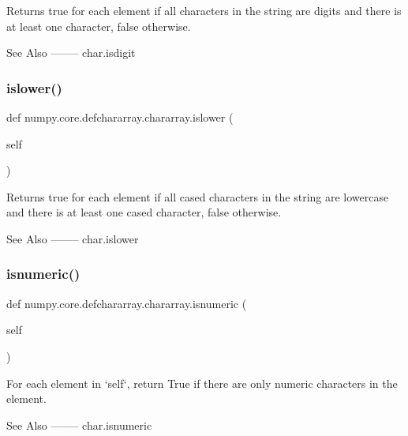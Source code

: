 \begin{DoxyVerb}Returns true for each element if all characters in the string are
digits and there is at least one character, false otherwise.

See Also
--------
char.isdigit\end{DoxyVerb}
 \mbox{\label{classnumpy_1_1core_1_1defchararray_1_1chararray_a3b792f2fd5d25aa1db29a0bf484e2c18}} 
\subsubsection{\texorpdfstring{islower()}{islower()}}
{\footnotesize\ttfamily def numpy.\+core.\+defchararray.\+chararray.\+islower (\begin{DoxyParamCaption}\item[{}]{self }\end{DoxyParamCaption})}

\begin{DoxyVerb}Returns true for each element if all cased characters in the
string are lowercase and there is at least one cased character,
false otherwise.

See Also
--------
char.islower\end{DoxyVerb}
 \mbox{\label{classnumpy_1_1core_1_1defchararray_1_1chararray_afdd86149bb138aade7f5c31fc39a7214}} 
\subsubsection{\texorpdfstring{isnumeric()}{isnumeric()}}
{\footnotesize\ttfamily def numpy.\+core.\+defchararray.\+chararray.\+isnumeric (\begin{DoxyParamCaption}\item[{}]{self }\end{DoxyParamCaption})}

\begin{DoxyVerb}For each element in `self`, return True if there are only
numeric characters in the element.

See Also
--------
char.isnumeric\end{DoxyVerb}
 \mbox{\label{classnumpy_1_1core_1_1defchararray_1_1chararray_adaabb118f02d4252fb43d22d0348ccad}} 
